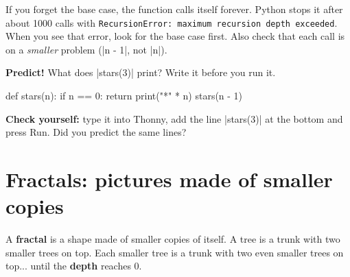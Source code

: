 \begin{center}
\end{center}

\begin{bughunt}[No base case = never-ending dolls]
If you forget the base case, the function calls itself forever. Python stops it after about 1000 calls with \texttt{RecursionError: maximum recursion depth exceeded}. When you see that error, look for the base case first. Also check that each call is on a \emph{smaller} problem (\py|n - 1|, not \py|n|).
\end{bughunt}

\textbf{Predict!} What does \py|stars(3)| print? Write it before you run it.
\begin{pycode}
def stars(n):
    if n == 0:
        return
    print("*" * n)
    stars(n - 1)
\end{pycode}
\textbf{Check yourself:} type it into Thonny, add the line \py|stars(3)| at the bottom and press Run. Did you predict the same lines?

\section{Fractals: pictures made of smaller copies}
A \textbf{fractal} is a shape made of smaller copies of itself. A tree is a trunk with two smaller trees on top. Each smaller tree is a trunk with two even smaller trees on top... until the \textbf{depth} reaches 0.


